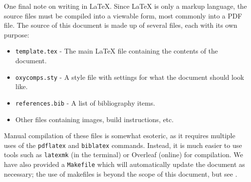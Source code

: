 \documentclass[10pt,twocolumn]{article}
\begin{document}
One final note on writing in LaTeX.
Since LaTeX is only a markup language, the source files must be compiled into a viewable form, most commonly into a PDF file.
The source of this document is made up of several files, each with its own purpose:
\begin{itemize}
    \item \texttt{template.tex} - The main LaTeX file containing the contents of the document.
    \item \texttt{oxycomps.sty} - A style file with settings for what the document should look like.
    \item \texttt{references.bib} - A list of bibliography items.
    \item Other files containing images, build instructions, etc.
\end{itemize}
Manual compilation of these files is somewhat esoteric, as it requires multiple uses of the \texttt{pdflatex} and \texttt{biblatex} commands.
Instead, it is much easier to use tools such as \texttt{latexmk} (in the terminal) or Overleaf (online) for compilation.
We have also provided a \texttt{Makefile} which will automatically update the document as necessary; the use of makefiles is beyond the scope of this document, but see \textcite{Lambert2021MakefileTutorial}.

\end{document}
